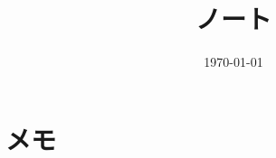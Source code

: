 \documentclass[6pt]{jreport}
\title{ノート}
\author{}
\date{\today}
\begin{document}
\maketitle
\tableofcontents

\chapter{メモ}

%
%
%
%
%
%
%
%
%
%
%



\end{document}

